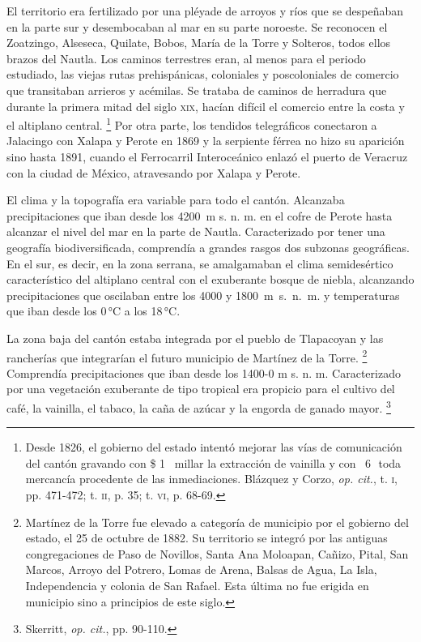 \documentclass[14pt,twoside,final]{extbook} %
\let\oldfootnote\footnote
\renewcommand\footnote[1]{%
\oldfootnote{\hspace{1mm}#1}}
\begin{document}
El territorio era fertilizado por una pléyade de arroyos y ríos que se despeñaban en la parte sur y desembocaban al mar en su parte noroeste. Se reconocen el Zoatzingo, Alseseca, Quilate, Bobos, María de la Torre y Solteros, todos ellos brazos del Nautla. Los caminos terrestres eran, al menos para el periodo estudiado, las viejas rutas prehispánicas, coloniales y poscoloniales de comercio que transitaban arrieros y acémilas. Se trataba de caminos de herradura que durante la primera mitad del siglo \textsc{xix}, hacían difícil el comercio entre la costa y el altiplano central.\footnote{Desde 1826, el gobierno del estado intentó mejorar las vías de comunicación del cantón gravando con \$ 1 \texttimes\ millar la extracción de vainilla y con \textcent\ 6\,\textonequarter\ toda mercancía procedente de las inmediaciones. Blázquez y Corzo, \emph{op. cit.}, t. \textsc{i}, pp. 471-472; t. \textsc{ii}, p. 35; t. \textsc{vi}, p. 68-69.} Por otra parte, los tendidos telegráficos conectaron a Jalacingo con Xalapa y Perote en 1869 y la serpiente férrea no hizo su aparición sino hasta 1891, cuando el Ferrocarril Interoceánico enlazó el puerto de Veracruz con la ciudad de México, atravesando por Xalapa y Perote.

El clima y la topografía era variable para todo el cantón. Alcanzaba precipitaciones que iban desde los 4200~m s. n. m. en el cofre de Perote hasta alcanzar el nivel del mar en la parte de Nautla. Caracterizado por tener una geografía biodiversificada, comprendía a grandes rasgos dos subzonas geográficas. En el sur, es decir, en la zona serrana, se amalgamaban el clima semidesértico característico del altiplano central con el exuberante bosque de niebla, alcanzando precipitaciones que oscilaban entre los 4000 y \mbox{1800 m s. n. m.} y temperaturas que iban desde los 0\,°C a los 18\,°C.

La zona baja del cantón estaba integrada por el pueblo de Tlapacoyan y las rancherías que integrarían el futuro municipio de Martínez de la Torre.\footnote{Martínez de la Torre fue elevado a categoría de municipio por el gobierno del estado, el 25 de octubre de 1882. Su territorio se integró por las antiguas congregaciones de Paso de Novillos, Santa Ana Moloapan, Cañizo, Pital, San Marcos, Arroyo del Potrero, Lomas de Arena, Balsas de Agua, La Isla, Independencia y colonia de San Rafael. Esta última no fue erigida en municipio sino a principios de este siglo.} Comprendía precipitaciones que iban desde los 1400-0 m s. n. m. Caracterizado por una vegetación exuberante de tipo tropical era propicio para el cultivo del café, la vainilla, el tabaco, la caña de azúcar y la engorda de ganado mayor.\footnote{Skerritt, \emph{op. cit.}, pp. 90-110.}
\end{document}
